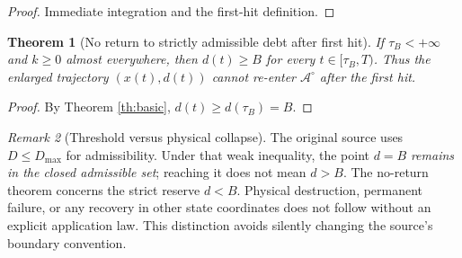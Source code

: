 \documentclass[11pt,letterpaper]{article}
\newtheorem{theorem}{Theorem}[section]
\theoremstyle{definition}\newtheorem{definition}[theorem]{Definition}\newtheorem{example}[theorem]{Example}
\theoremstyle{remark}\newtheorem{remark}[theorem]{Remark}
\begin{document}
\begin{proof}Immediate integration and the first-hit definition.\end{proof}
\begin{theorem}[No return to strictly admissible debt after first hit]\label{th:noreturn}
If $\tau_B<+\infty$ and $k\geq0$ almost everywhere, then $d(t)\geq B$ for every $t\in[\tau_B,T)$. Thus the enlarged trajectory $(x(t),d(t))$ cannot re-enter $\mathscr A^\circ$ after the first hit.
\end{theorem}
\begin{proof}
By Theorem \ref{th:basic}, $d(t)\geq d(\tau_B)=B$.
\end{proof}
\begin{remark}[Threshold versus physical collapse]
The original source uses $D\leq D_{\max}$ for admissibility. Under that weak inequality, the point $d=B$ \emph{remains in the closed admissible set}; reaching it does not mean $d>B$. The no-return theorem concerns the strict reserve $d<B$. Physical destruction, permanent failure, or any recovery in other state coordinates does not follow without an explicit application law. This distinction avoids silently changing the source's boundary convention.
\end{remark}
\end{document}
